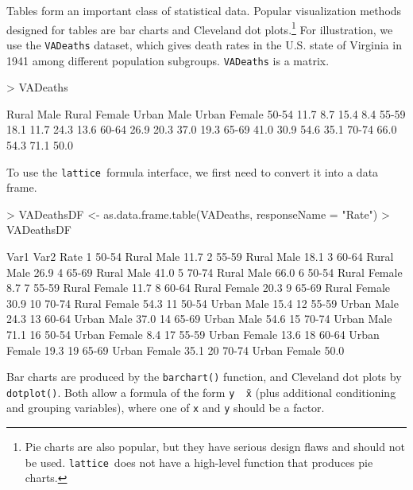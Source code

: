 \documentclass[10pt]{article}
\newcommand{\code}[1]{\texttt{#1}}
\newcommand{\lattice}{\code{lattice}}
\newcommand{\Rfunction}[1]{\code{#1()}}
\begin{document}
Tables form an important class of statistical data.  Popular
visualization methods designed for tables are bar charts and Cleveland
dot plots.\footnote{Pie charts are also popular, but they have serious
  design flaws and should not be used.  \lattice\ does not have a
  high-level function that produces pie charts.  }  For illustration,
we use the \code{VADeaths} dataset, which gives death rates in the
U.S. state of Virginia in 1941 among different population subgroups.
\code{VADeaths} is a matrix.
\begin{Schunk}
\begin{Sinput}
> VADeaths
\end{Sinput}
\begin{Soutput}
      Rural Male Rural Female Urban Male Urban Female
50-54       11.7          8.7       15.4          8.4
55-59       18.1         11.7       24.3         13.6
60-64       26.9         20.3       37.0         19.3
65-69       41.0         30.9       54.6         35.1
70-74       66.0         54.3       71.1         50.0
\end{Soutput}
\end{Schunk}
%
To use the \lattice\ formula interface, we first need to convert it
into a data frame.
\begin{Schunk}
\begin{Sinput}
> VADeathsDF <- as.data.frame.table(VADeaths, responseName = "Rate")
> VADeathsDF
\end{Sinput}
\begin{Soutput}
    Var1         Var2 Rate
1  50-54   Rural Male 11.7
2  55-59   Rural Male 18.1
3  60-64   Rural Male 26.9
4  65-69   Rural Male 41.0
5  70-74   Rural Male 66.0
6  50-54 Rural Female  8.7
7  55-59 Rural Female 11.7
8  60-64 Rural Female 20.3
9  65-69 Rural Female 30.9
10 70-74 Rural Female 54.3
11 50-54   Urban Male 15.4
12 55-59   Urban Male 24.3
13 60-64   Urban Male 37.0
14 65-69   Urban Male 54.6
15 70-74   Urban Male 71.1
16 50-54 Urban Female  8.4
17 55-59 Urban Female 13.6
18 60-64 Urban Female 19.3
19 65-69 Urban Female 35.1
20 70-74 Urban Female 50.0
\end{Soutput}
\end{Schunk}
%
Bar charts are produced by the \Rfunction{barchart} function, and
Cleveland dot plots by \Rfunction{dotplot}.  Both allow a formula of
the form \code{y \~\ x} (plus additional conditioning and grouping
variables), where one of \code{x} and \code{y} should be a factor.

\newpage
\end{document}
